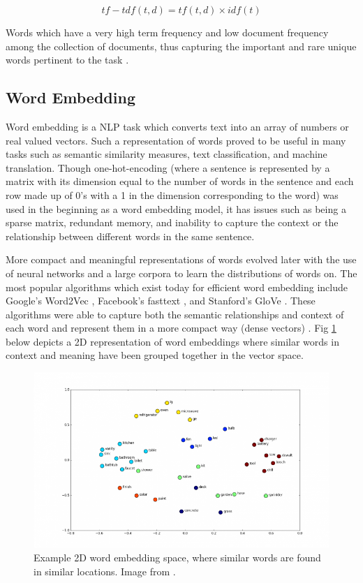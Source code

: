 	\begin{equation} tf-tdf(t,d) = tf(t,d) \times idf(t) \end{equation} 
	
	Words which have a very high term frequency and low document frequency among the collection of documents, thus capturing the important and rare unique words pertinent to the task \cite{tf_idf_defi}. 
	
	
	
	\subsection{Word Embedding}
	
	Word embedding is a NLP task which converts text into an array of numbers or real valued vectors. Such a representation of words proved to be useful in many tasks such as semantic similarity measures, text classification, and machine translation. Though one-hot-encoding (where a sentence is represented by a matrix with its dimension equal to the number of words in the sentence and each row made up of 0's with a 1 in the dimension corresponding to the word) was used in the beginning as a word embedding model, it has issues such as being a sparse matrix, redundant memory, and inability to capture the context or the relationship between different words in the same sentence. 
	
	More compact and meaningful representations of words evolved later with the use of neural networks and a large corpora to learn the distributions of words on. The most popular algorithms which exist today for efficient word embedding include Google's Word2Vec \cite{word2vec}, Facebook's fasttext \cite{fasttext}, and Stanford's GloVe \cite{glove}. These algorithms were able to capture both the semantic relationships and context of each word and represent them in a more compact way (dense vectors) \cite{shane_wordembedding}. Fig \ref{simple_embedding} below depicts a 2D representation of word embeddings where similar words in context and meaning have been grouped together in the vector space. 
	
	\begin{figure}[h!]
		\centering
		\includegraphics[scale=0.5]{images/2d_word_embedding}
		\caption{Example 2D word embedding space, where similar words are found in similar locations. Image from \cite{2d_embedding}.}
		\label{simple_embedding}
	\end{figure}
	
